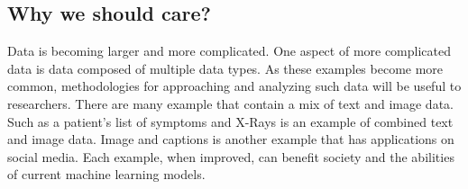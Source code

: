 \subsection{Why we should care?}

Data is becoming larger and more complicated.  One aspect of more complicated data is data composed of multiple data types. As these examples become more common, methodologies for approaching and analyzing such data will be useful to researchers.  There are many example that contain a mix of text and image data.  Such as a patient's list of symptoms and X-Rays is an example of combined text and image data.  Image and captions is another example that has applications on social media. Each example, when improved, can benefit society and the abilities of current machine learning models. 

